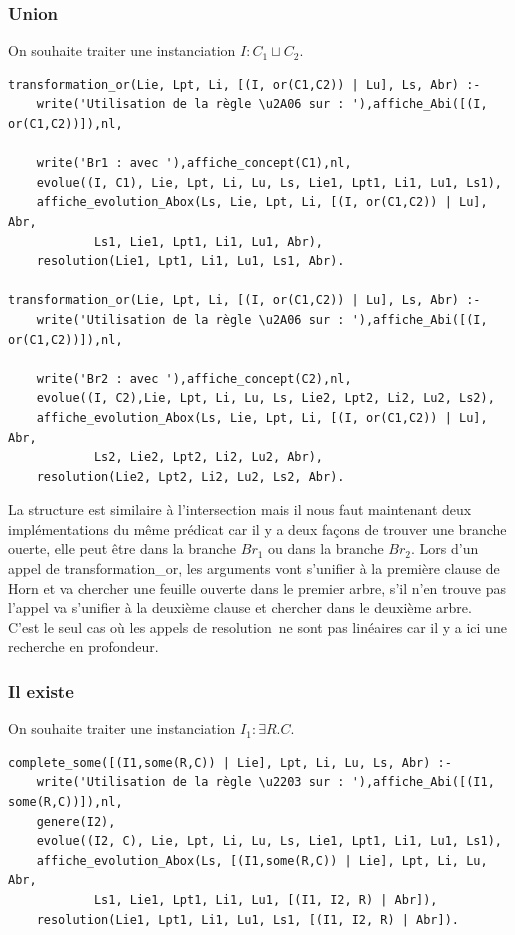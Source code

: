 \documentclass{article}
\begin{document}
\subsubsection{Union}
On souhaite traiter une instanciation $I:C_1\sqcup C_2$.
\begin{verbatim}
transformation_or(Lie, Lpt, Li, [(I, or(C1,C2)) | Lu], Ls, Abr) :- 
	write('Utilisation de la règle \u2A06 sur : '),affiche_Abi([(I, or(C1,C2))]),nl,
 
	write('Br1 : avec '),affiche_concept(C1),nl,
	evolue((I, C1), Lie, Lpt, Li, Lu, Ls, Lie1, Lpt1, Li1, Lu1, Ls1),
	affiche_evolution_Abox(Ls, Lie, Lpt, Li, [(I, or(C1,C2)) | Lu], Abr,
            Ls1, Lie1, Lpt1, Li1, Lu1, Abr),
	resolution(Lie1, Lpt1, Li1, Lu1, Ls1, Abr).
	
transformation_or(Lie, Lpt, Li, [(I, or(C1,C2)) | Lu], Ls, Abr) :- 
	write('Utilisation de la règle \u2A06 sur : '),affiche_Abi([(I, or(C1,C2))]),nl,
 
	write('Br2 : avec '),affiche_concept(C2),nl,
	evolue((I, C2),Lie, Lpt, Li, Lu, Ls, Lie2, Lpt2, Li2, Lu2, Ls2),
	affiche_evolution_Abox(Ls, Lie, Lpt, Li, [(I, or(C1,C2)) | Lu], Abr,
            Ls2, Lie2, Lpt2, Li2, Lu2, Abr),
	resolution(Lie2, Lpt2, Li2, Lu2, Ls2, Abr).
\end{verbatim}

La structure est similaire à l'intersection mais il nous faut maintenant deux implémentations du même prédicat car il y a deux façons de trouver une branche ouerte, elle peut être dans la branche $Br_1$ ou dans la branche $Br_2$. Lors d'un appel de \color{blue}transformation\_or\color{black}, les arguments vont s'unifier à la première clause de Horn et va chercher une feuille ouverte dans le premier arbre, s'il n'en trouve pas l'appel va s'unifier à la deuxième clause et chercher dans le deuxième arbre. \\

C'est le seul cas où les appels de \color{blue}resolution\color{black}\ ne sont pas linéaires car il y a ici une recherche en profondeur.
\subsubsection{Il existe}
On souhaite traiter une instanciation $I_1:\exists R.C$.
\begin{verbatim}
complete_some([(I1,some(R,C)) | Lie], Lpt, Li, Lu, Ls, Abr) :-
	write('Utilisation de la règle \u2203 sur : '),affiche_Abi([(I1, some(R,C))]),nl,
	genere(I2),
	evolue((I2, C), Lie, Lpt, Li, Lu, Ls, Lie1, Lpt1, Li1, Lu1, Ls1),
	affiche_evolution_Abox(Ls, [(I1,some(R,C)) | Lie], Lpt, Li, Lu, Abr,
            Ls1, Lie1, Lpt1, Li1, Lu1, [(I1, I2, R) | Abr]),
	resolution(Lie1, Lpt1, Li1, Lu1, Ls1, [(I1, I2, R) | Abr]).
\end{verbatim}
\end{document}
